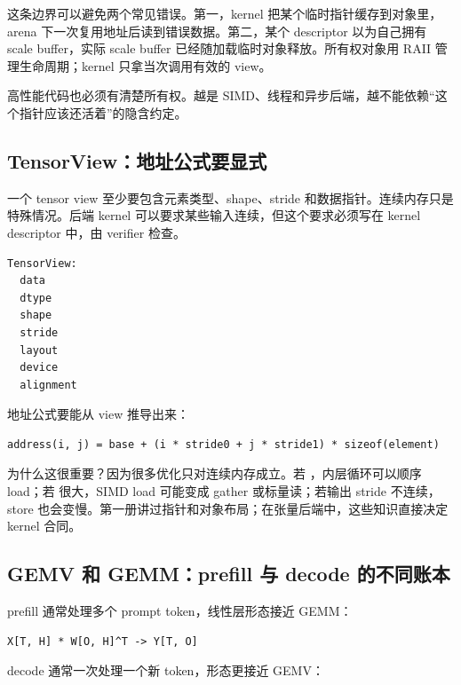 这条边界可以避免两个常见错误。第一，kernel 把某个临时指针缓存到对象里，arena 下一次复用地址后读到错误数据。第二，某个 descriptor 以为自己拥有 scale buffer，实际 scale buffer 已经随加载临时对象释放。所有权对象用 RAII 管理生命周期；kernel 只拿当次调用有效的 view。

\begin{warningbox}
高性能代码也必须有清楚所有权。越是 SIMD、线程和异步后端，越不能依赖“这个指针应该还活着”的隐含约定。
\end{warningbox}

\subsection{TensorView：地址公式要显式}

一个 tensor view 至少要包含元素类型、shape、stride 和数据指针。连续内存只是特殊情况。后端 kernel 可以要求某些输入连续，但这个要求必须写在 kernel descriptor 中，由 verifier 检查。

\begin{lstlisting}[numbers=none,caption={TensorView 的语义字段}]
TensorView:
  data
  dtype
  shape
  stride
  layout
  device
  alignment
\end{lstlisting}

地址公式要能从 view 推导出来：

\begin{lstlisting}[numbers=none,caption={二维 view 的地址公式}]
address(i, j) = base + (i * stride0 + j * stride1) * sizeof(element)
\end{lstlisting}

为什么这很重要？因为很多优化只对连续内存成立。若 ，内层循环可以顺序 load；若  很大，SIMD load 可能变成 gather 或标量读；若输出 stride 不连续，store 也会变慢。第一册讲过指针和对象布局；在张量后端中，这些知识直接决定 kernel 合同。

\subsection{GEMV 和 GEMM：prefill 与 decode 的不同账本}

prefill 通常处理多个 prompt token，线性层形态接近 GEMM：

\begin{lstlisting}[numbers=none,caption={prefill linear 的抽象形态}]
X[T, H] * W[O, H]^T -> Y[T, O]
\end{lstlisting}

decode 通常一次处理一个新 token，形态更接近 GEMV：

